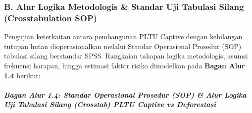 \documentclass[
]{article}
\begin{document}
\subsubsection{B. Alur Logika Metodologis \& Standar Uji Tabulasi Silang
(Crosstabulation
SOP)}\label{b.-alur-logika-metodologis-standar-uji-tabulasi-silang-crosstabulation-sop}

Pengujian keterkaitan antara pembangunan PLTU Captive dengan kehilangan
tutupan hutan dioperasionalkan melalui Standar Operasional Prosedur
(SOP) tabulasi silang berstandar SPSS. Rangkaian tahapan logika
metodologis, asumsi frekuensi harapan, hingga estimasi faktor risiko
dimodelkan pada \textbf{Bagan Alur 1.4} berikut:

\subparagraph{Bagan Alur 1.4: Standar Operasional Prosedur (SOP) \& Alur
Logika Uji Tabulasi Silang (Crosstab) PLTU Captive vs
Deforestasi}\label{bagan-alur-1.4-standar-operasional-prosedur-sop-alur-logika-uji-tabulasi-silang-crosstab-pltu-captive-vs-deforestasi}
\end{document}
